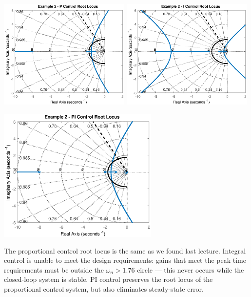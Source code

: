 \documentclass{book}
\begin{document}
\begin{center}
	\includegraphics[width=0.49\textwidth,trim={1cm 0 1cm 0},clip]{Lecture12Example2Proportional.eps}
	\hfill
	\includegraphics[width=0.49\textwidth,trim={1cm 0 1cm 0},clip]{Lecture12Example2Integral.eps}
	
	\includegraphics[width=0.6\textwidth]{Lecture12Example2PI.eps}
\end{center}
The proportional control root locus is the same as we found last lecture. Integral control is unable to meet the design requirements: gains that meet the peak time requirements must be outside the $ \omega_n>1.76 $ circle --- this never occurs while the closed-loop system is stable. PI control preserves the root locus of the proportional control system, but also eliminates steady-state error.
\end{document}
